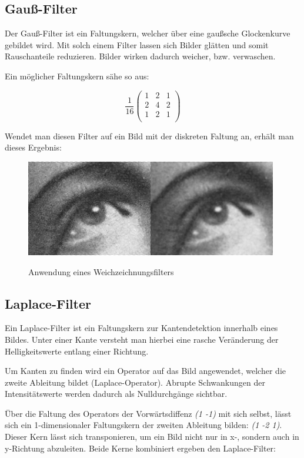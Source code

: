\subsection{Gauß-Filter}
Der Gauß-Filter ist ein Faltungskern, welcher über eine gaußsche Glockenkurve gebildet wird.
Mit solch einem Filter lassen sich Bilder glätten und somit Rauschanteile reduzieren.
Bilder wirken dadurch weicher, bzw. verwaschen.

Ein möglicher Faltungskern sähe so aus:

$$ \frac{1}{16} \left( \begin{array}{rrr}
1 & 2 & 1 \\
2 & 4 & 2 \\
1 & 2 & 1 \\
\end{array}\right) $$

Wendet man diesen Filter auf ein Bild mit der diskreten Faltung an, erhält man dieses Ergebnis:

\begin{figure}[ht]
   \centering
     \includegraphics[width=11cm]{Bilder/Gaussian_Blur} \\
 \caption{Anwendung eines Weichzeichnungsfilters}
 \label{fig:Blur}
\end{figure}

\subsection{Laplace-Filter}
Ein Laplace-Filter ist ein Faltungskern zur Kantendetektion innerhalb eines Bildes.
Unter einer Kante versteht man hierbei eine rasche Veränderung der Helligkeitswerte entlang einer Richtung.

Um Kanten zu finden wird ein Operator auf das Bild angewendet, welcher die zweite Ableitung bildet (Laplace-Operator). Abrupte Schwankungen der Intensitätswerte werden dadurch als Nulldurchgänge sichtbar.

Über die Faltung des Operators der Vorwärtsdiffenz {\em (1 -1)} mit sich selbst, lässt sich ein 1-dimensionaler Faltungskern der zweiten Ableitung bilden: {\em (1 -2 1)}.
Dieser Kern lässt sich transponieren, um ein Bild nicht nur in x-, sondern auch in y-Richtung abzuleiten.
Beide Kerne kombiniert ergeben den Laplace-Filter:

